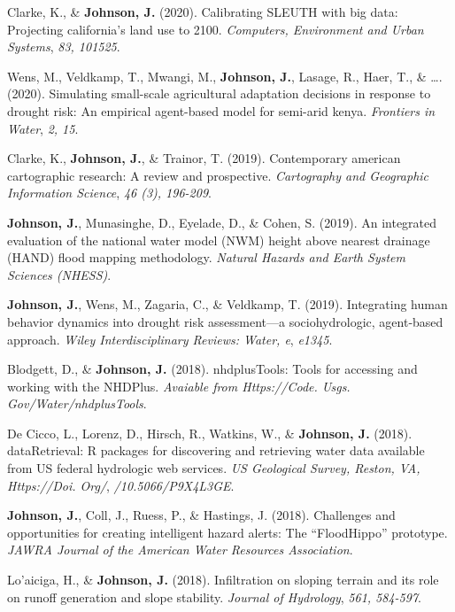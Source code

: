 \documentclass[11pt,a4paper,]{awesome-cv}
\begin{document}
\leavevmode{}%
Clarke, K., \& \textbf{Johnson, J.} (2020). Calibrating SLEUTH with big
data: Projecting california's land use to 2100. \emph{Computers,
Environment and Urban Systems}, \emph{83, 101525}.

\leavevmode{}%
Wens, M., Veldkamp, T., Mwangi, M., \textbf{Johnson, J.}, Lasage, R.,
Haer, T., \& \ldots. (2020). Simulating small-scale agricultural
adaptation decisions in response to drought risk: An empirical
agent-based model for semi-arid kenya. \emph{Frontiers in Water},
\emph{2, 15}.

\leavevmode{}%
Clarke, K., \textbf{Johnson, J.}, \& Trainor, T. (2019). Contemporary
american cartographic research: A review and prospective.
\emph{Cartography and Geographic Information Science}, \emph{46 (3),
196-209}.

\leavevmode{}%
\textbf{Johnson, J.}, Munasinghe, D., Eyelade, D., \& Cohen, S. (2019).
An integrated evaluation of the national water model (NWM) height above
nearest drainage (HAND) flood mapping methodology. \emph{Natural Hazards
and Earth System Sciences (NHESS)}.

\leavevmode{}%
\textbf{Johnson, J.}, Wens, M., Zagaria, C., \& Veldkamp, T. (2019).
Integrating human behavior dynamics into drought risk assessment---a
sociohydrologic, agent‐based approach. \emph{Wiley Interdisciplinary
Reviews: Water, e}, \emph{e1345}.

\leavevmode{}%
Blodgett, D., \& \textbf{Johnson, J.} (2018). nhdplusTools: Tools for
accessing and working with the NHDPlus. \emph{Avaiable from
Https://Code. Usgs. Gov/Water/nhdplusTools}.

\leavevmode{}%
De Cicco, L., Lorenz, D., Hirsch, R., Watkins, W., \&
\textbf{Johnson, J.} (2018). dataRetrieval: R packages for discovering
and retrieving water data available from US federal hydrologic web
services. \emph{US Geological Survey, Reston, VA, Https://Doi. Org/},
\emph{/10.5066/P9X4L3GE}.

\leavevmode{}%
\textbf{Johnson, J.}, Coll, J., Ruess, P., \& Hastings, J. (2018).
Challenges and opportunities for creating intelligent hazard alerts: The
{``FloodHippo''} prototype. \emph{JAWRA Journal of the American Water
Resources Association}.

\leavevmode{}%
Lo'aiciga, H., \& \textbf{Johnson, J.} (2018). Infiltration on sloping
terrain and its role on runoff generation and slope stability.
\emph{Journal of Hydrology}, \emph{561, 584-597}.
\end{document}
